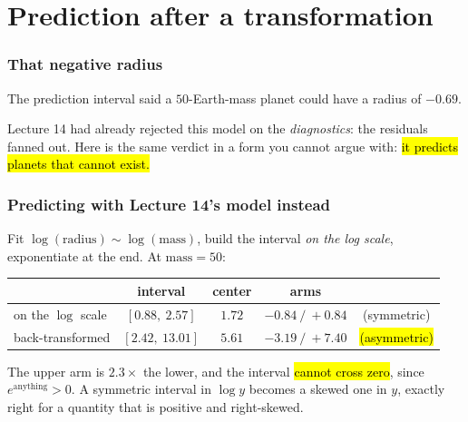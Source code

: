 \documentclass[slidestop,compress,mathserif]{beamer}
\begin{document}
\section{Prediction after a transformation}
\begin{frame}
\frametitle{That negative radius}

The prediction interval said a $50$-Earth-mass planet could have a radius of $-0.69$.

\pause
\vspace{0.4em}

\pause
\vspace{0.4em}
Lecture 14 had already rejected this model on the \emph{diagnostics}: the residuals fanned out. Here is the same verdict in a form you cannot argue with: \hl{it predicts planets that cannot exist.}

\end{frame}


\begin{frame}
\frametitle{Predicting with Lecture 14's model instead}

Fit $\log(\text{radius}) \sim \log(\text{mass})$, build the interval \emph{on the log scale}, exponentiate at the end. At $\text{mass} = 50$:

\pause
\vspace{0.3em}
{\footnotesize
\begin{center}
\setlength{\tabcolsep}{5pt}
\begin{tabular}{@{}lcccc@{}}
\toprule
& \textbf{interval} & \textbf{center} & \textbf{arms} & \\
\midrule
on the $\log$ scale & $[0.88,\ 2.57]$ & $1.72$ & $-0.84\ /\ +0.84$ & (symmetric) \\
back-transformed & $[2.42,\ 13.01]$ & $5.61$ & $-3.19\ /\ +7.40$ & \hl{(asymmetric)} \\
\bottomrule
\end{tabular}
\end{center}}

\pause
\vspace{0.3em}
{\small The upper arm is $2.3\times$ the lower, and the interval \hl{cannot cross zero}, since $e^{\text{anything}} > 0$. A symmetric interval in $\log y$ becomes a skewed one in $y$, exactly right for a quantity that is positive and right-skewed.}

\end{frame}
\end{document}
